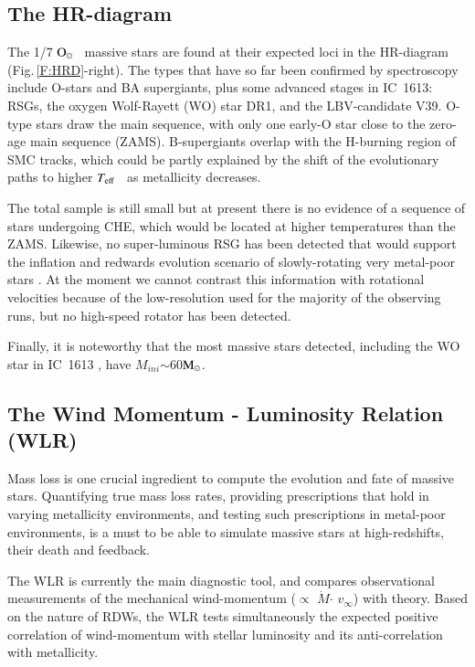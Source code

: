 \documentclass{iau}
\newcommand{\Msun}{$\rm M_{\odot}$}
\newcommand{\Osun}{$\rm O_{\odot}$}
\newcommand{\Mini}{\mbox{$M_{ini}$}}
\newcommand{\teff}{\mbox{$T_{\rm eff}$}}
\newcommand{\vinf}{\mbox{$v_{\infty}$}}
\newcommand{\Mdot}{$\dot M$}
\begin{document}
\subsection{The HR-diagram}

The 1/7 \Osun~ massive stars are found at their expected loci in the HR-diagram (Fig.\,\ref{F:HRD}-right).
The types that have so far been confirmed by spectroscopy include O-stars and BA supergiants,
plus some advanced stages in IC~1613: RSGs, the oxygen Wolf-Rayett (WO) star DR1, and the LBV-candidate V39.
O-type stars draw the main sequence, with only one early-O star close to the zero-age main sequence (ZAMS).
B-supergiants overlap with the H-burning region of SMC tracks,
which could be partly explained by the shift of
the evolutionary paths to higher \teff~ as metallicity decreases.

The total sample is still small but at present there is no evidence
of a sequence of stars undergoing CHE, which would be located at higher temperatures
than the ZAMS. Likewise, no super-luminous RSG has been detected that would support
the inflation and redwards evolution scenario of slowly-rotating very metal-poor stars \citep{Szal15}.
At the moment we cannot contrast this information with rotational velocities
because of the low-resolution used for the majority of the observing runs,
but no high-speed rotator has been detected.

Finally, it is noteworthy that the most massive stars detected,
including the WO star in IC~1613 \citep{Tral15},
have \Mini$\sim$60\Msun.


\subsection{The Wind Momentum - Luminosity Relation (WLR)}
\label{ss:wlr}

Mass loss is one crucial ingredient to compute the evolution and fate of massive stars.
Quantifying true mass loss rates, providing prescriptions that hold
in varying metallicity environments, and testing such prescriptions in metal-poor environments,
is a must to be able to simulate massive stars at high-redshifts, their death and feedback.

The WLR is currently the main diagnostic tool, and compares observational
measurements of the mechanical wind-momentum ($\propto$ \Mdot $\cdot$ \vinf) with theory.
Based on the nature of RDWs,
the WLR tests simultaneously the expected positive correlation
of wind-momentum with stellar luminosity and its anti-correlation with metallicity.
\end{document}
